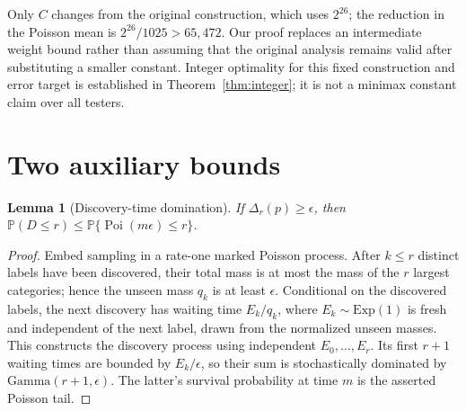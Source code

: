 \documentclass[10pt]{article}
\newtheorem{lemma}{Lemma}
\newcommand{\Prob}{\mathbb P}
\newcommand{\Poi}{\operatorname{Poi}}
\begin{document}
Only $C$ changes from the original construction, which uses $2^{26}$;
the reduction in the Poisson mean is $2^{26}/1025>65{,}472$.
Our proof replaces an intermediate weight bound rather than assuming
that the original analysis remains valid after substituting a smaller
constant. Integer optimality for this fixed construction and error target
is established in Theorem~\ref{thm:integer}; it is not a minimax constant
claim over all testers.

\section{Two auxiliary bounds}
\begin{lemma}[Discovery-time domination]\label{lem:count}
If $\Delta_r(p)\ge\epsilon$, then
$\Prob(D\le r)\le\Prob\{\Poi(m\epsilon)\le r\}$.
\end{lemma}
\begin{proof}
Embed sampling in a rate-one marked Poisson process. After $k\le r$
distinct labels have been discovered, their total mass is at most the mass
of the $r$ largest categories; hence the unseen mass $q_k$ is at least
$\epsilon$. Conditional on the discovered labels, the next discovery has
waiting time $E_k/q_k$, where $E_k\sim\mathrm{Exp}(1)$ is fresh and
independent of the next label, drawn from the normalized unseen masses.
This constructs the discovery process using independent $E_0,\ldots,E_r$.
Its first $r+1$ waiting times are bounded by $E_k/\epsilon$, so their sum
is stochastically dominated by $\mathrm{Gamma}(r+1,\epsilon)$.
The latter's survival probability at time $m$ is the asserted Poisson tail.
\end{proof}
\end{document}
